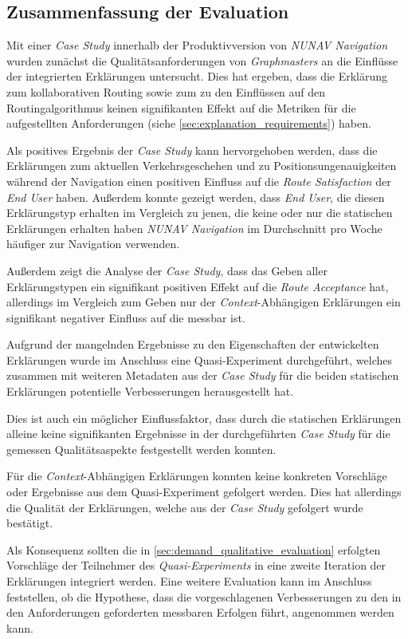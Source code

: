 \subsection{Zusammenfassung der Evaluation}

Mit einer \textit{Case Study} innerhalb der Produktivversion von \textit{NUNAV Navigation} wurden zunächst die Qualitätsanforderungen von \textit{Graphmasters} an die Einflüsse der integrierten Erklärungen untersucht. Dies hat ergeben, dass die Erklärung zum kollaborativen Routing sowie zum zu den Einflüssen auf den Routingalgorithmus keinen signifikanten Effekt auf die Metriken für die aufgestellten Anforderungen (siehe \autoref{sec:explanation_requirements}) haben.

Als positives Ergebnis der \textit{Case Study} kann hervorgehoben werden, dass die Erklärungen zum aktuellen Verkehrsgeschehen und zu Positionsungenauigkeiten während der Navigation einen positiven Einfluss auf die \textit{Route Satisfaction} der \textit{End User} haben. Außerdem konnte gezeigt werden, dass \textit{End User}, die diesen Erklärungstyp erhalten im Vergleich zu jenen, die keine oder nur die statischen Erklärungen erhalten haben \textit{NUNAV Navigation} im Durchschnitt pro Woche häufiger zur Navigation verwenden.

Außerdem zeigt die Analyse der \textit{Case Study}, dass das Geben aller Erklärungstypen ein signifikant positiven Effekt auf die \textit{Route Acceptance} hat, allerdings im Vergleich zum Geben nur der \textit{Context}-Abhängigen Erklärungen ein signifikant negativer Einfluss auf die  messbar ist.

Aufgrund der mangelnden Ergebnisse zu den Eigenschaften der entwickelten Erklärungen wurde im Anschluss eine Quasi-Experiment durchgeführt, welches zusammen mit weiteren Metadaten aus der \textit{Case Study} für die beiden statischen Erklärungen potentielle Verbesserungen herausgestellt hat.

Dies ist auch ein möglicher Einflussfaktor, dass durch die statischen Erklärungen alleine keine signifikanten Ergebnisse in der durchgeführten \textit{Case Study} für die gemessen Qualitätsaspekte festgestellt werden konnten.

Für die \textit{Context}-Abhängigen Erklärungen konnten keine konkreten Vorschläge oder Ergebnisse aus dem Quasi-Experiment gefolgert werden. Dies hat allerdings die Qualität der Erklärungen, welche aus der \textit{Case Study} gefolgert wurde bestätigt.

Als Konsequenz sollten die in \autoref{sec:demand_qualitative_evaluation} erfolgten Vorschläge der Teilnehmer des \textit{Quasi-Experiments} in eine zweite Iteration der Erklärungen integriert werden. Eine weitere Evaluation kann im Anschluss feststellen, ob die Hypothese, dass die vorgeschlagenen Verbesserungen zu den in den Anforderungen geforderten messbaren Erfolgen führt, angenommen werden kann.

